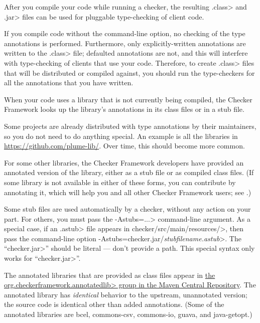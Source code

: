 After you compile your code while running a checker, the resulting
\<.class> and \<.jar> files can be used for pluggable type-checking of client code.

If you compile code without the 
command-line option, no checking of the type
annotations is performed.  Furthermore, only explicitly-written annotations
are written to the \<.class> file; defaulted annotations are not, and this
will interfere with type-checking of clients that use your code.
Therefore, to create
\<.class> files that will be distributed or compiled against, you should run the
type-checkers for all the annotations that you have written.



When your code uses a library that is not currently being compiled, the
Checker Framework looks up the library's annotations in its class files or
in a stub file.

Some projects are already distributed with type annotations by their
maintainers, so you do not need to do anything special.
An example is all the libraries in \url{https://github.com/plume-lib/}.
Over time, this should become more common.

For some other libraries, the Checker Framework developers have provided an
annotated version of the library, either as a stub file or as compiled class files.
(If some library is not available in either of these forms,
you can contribute by annotating it, which will
help you and all other Checker Framework users; see
.)

Some stub files are used automatically by a checker, without any action on
your part.  For others, you must pass the \<-Astubs=...> command-line argument.
As a special case, if an \<.astub> file appears in
\<checker/src/main/resources/>, then pass the command-line option
\<-Astubs=checker.jar/\emph{stubfilename.astub}>.
The ``\<checker.jar>'' should be literal --- don't provide a path.
This special syntax only works for ``\<checker.jar>''.

The annotated libraries that are provided as class files appear in
\href{https://central.sonatype.com/search?q=org.checkerframework.annotatedlib}{the
  \<org.checkerframework.annotatedlib> group in the Maven Central Repository}.
The annotated library has \emph{identical} behavior to the upstream,
unannotated version; the source code is identical other than added
annotations.
%
(Some of the annotated libraries are
bcel,
commons-csv,
commons-io,
guava,
and
java-getopt.)

